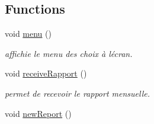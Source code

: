 \subsection*{Functions}
\begin{DoxyCompactItemize}
\item 
\hypertarget{group__client_ga2a0e843767aeea4f433a28b9c54f573a}{}void \hyperlink{group__client_ga2a0e843767aeea4f433a28b9c54f573a}{menu} ()\label{group__client_ga2a0e843767aeea4f433a28b9c54f573a}

\begin{DoxyCompactList}\small\item\em affichie le menu des choix à l\textquotesingle{}écran. \end{DoxyCompactList}\item 
\hypertarget{group__client_gacc28d96d3dde01fd0b1290d67ed5c521}{}void \hyperlink{group__client_gacc28d96d3dde01fd0b1290d67ed5c521}{receive\+Rapport} ()\label{group__client_gacc28d96d3dde01fd0b1290d67ed5c521}

\begin{DoxyCompactList}\small\item\em permet de recevoir le rapport mensuelle. \end{DoxyCompactList}\item 
\hypertarget{group__client_gaa404f7b3293c0f454e9afdd108c7b35e}{}void \hyperlink{group__client_gaa404f7b3293c0f454e9afdd108c7b35e}{new\+Report} ()\label{group__client_gaa404f7b3293c0f454e9afdd108c7b35e}


\end{DoxyCompactItemize}
